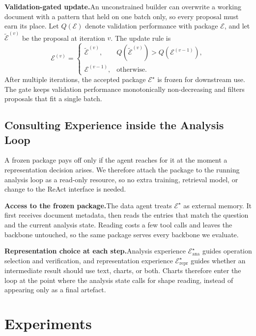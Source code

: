 \documentclass{article}
\newcommand{\stitle}[1]{\noindent\textbf{#1}}
\begin{document}
\stitle{Validation-gated update.}\quad An unconstrained builder can overwrite a working document with a pattern that held on one batch only, so every proposal must earn its place. Let $Q(\mathcal{E})$ denote validation performance with package $\mathcal{E}$, and let $\widetilde{\mathcal{E}}^{(v)}$ be the proposal at iteration $v$. The update rule is
\begin{equation}
\mathcal{E}^{(v)}=
\begin{cases}
\widetilde{\mathcal{E}}^{(v)}, & Q(\widetilde{\mathcal{E}}^{(v)})>Q(\mathcal{E}^{(v-1)}),\\[2pt]
\mathcal{E}^{(v-1)}, & \text{otherwise}.
\end{cases}
\label{eq:experience-gate}
\end{equation}
After multiple iterations, the accepted package $\mathcal{E}^{\star}$ is frozen for downstream use. The gate keeps validation performance monotonically non-decreasing and filters proposals that fit a single batch.

\subsection{Consulting Experience inside the Analysis Loop}
\label{sec:online}

\noindent A frozen package pays off only if the agent reaches for it at the moment a representation decision arises. We therefore attach the package to the running analysis loop as a read-only resource, so no extra training, retrieval model, or change to the ReAct interface is needed.

\stitle{Access to the frozen package.}\quad The data agent treats $\mathcal{E}^{\star}$ as external memory. It first receives document metadata, then reads the entries that match the question and the current analysis state. Reading costs a few tool calls and leaves the backbone untouched, so the same package serves every backbone we evaluate.

\stitle{Representation choice at each step.}\quad Analysis experience $\mathcal{E}_{\mathrm{ana}}^{\star}$ guides operation selection and verification, and representation experience $\mathcal{E}_{\mathrm{repr}}^{\star}$ guides whether an intermediate result should use text, charts, or both. Charts therefore enter the loop at the point where the analysis state calls for shape reading, instead of appearing only as a final artefact.

\section{Experiments}
\label{sec:experiments}
\end{document}
